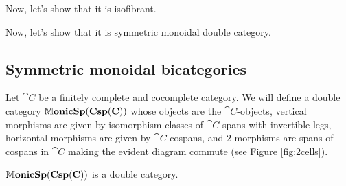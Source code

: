 \documentclass[./Spans_of_cospans_II.tex]{subfiles}
\begin{document}
Now, let's show that it is isofibrant.  

Now, let's show that it is symmetric monoidal double category.  
\subsection{Symmetric monoidal bicategories} %
\label{subsec.SpansCospansAreSMBicat}

\begin{defn}
	\label{def:DblCatMonSpanCsp}
	Let $\cat{C}$ be a finitely complete and cocomplete category. We will define a double category $\mathbb{M}\mathbf{onicSp(Csp(C))}$ whose objects are the $\cat{C}$-objects, vertical morphisms are given by isomorphism classes of $\cat{C}$-spans with invertible legs, horizontal morphisms are given by $\cat{C}$-cospans, and $2$-morphisms are spans of cospans in $\cat{C}$ making the evident diagram commute (see Figure \ref{fig:2cells}).  
\end{defn}

\begin{lem}
	\label{lem:SpanCospanDoubleCat}
	$\mathbb{M}\mathbf{onicSp(Csp(C))}$ is a double category.  
\end{lem}
\end{document}
